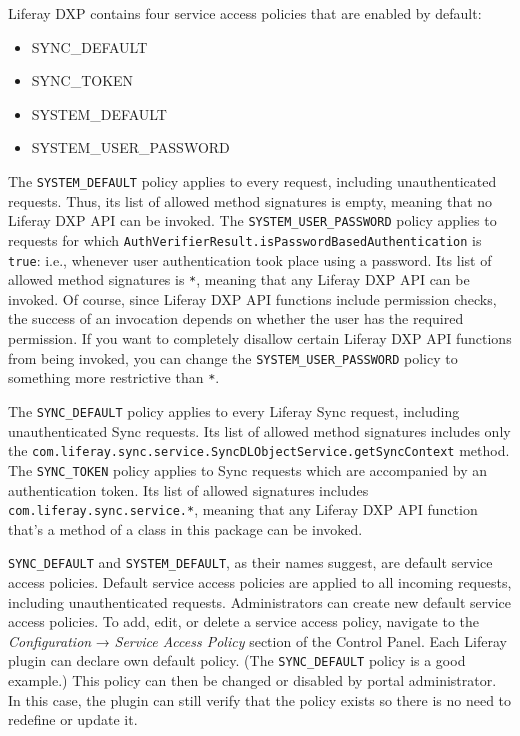 Liferay DXP contains four service access policies that are enabled by
default:

\begin{itemize}
\tightlist
\item
  SYNC\_DEFAULT
\item
  SYNC\_TOKEN
\item
  SYSTEM\_DEFAULT
\item
  SYSTEM\_USER\_PASSWORD
\end{itemize}

The \texttt{SYSTEM\_DEFAULT} policy applies to every request, including
unauthenticated requests. Thus, its list of allowed method signatures is
empty, meaning that no Liferay DXP API can be invoked. The
\texttt{SYSTEM\_USER\_PASSWORD} policy applies to requests for which
\texttt{AuthVerifierResult.isPasswordBasedAuthentication} is
\texttt{true}: i.e., whenever user authentication took place using a
password. Its list of allowed method signatures is \texttt{*}, meaning
that any Liferay DXP API can be invoked. Of course, since Liferay DXP
API functions include permission checks, the success of an invocation
depends on whether the user has the required permission. If you want to
completely disallow certain Liferay DXP API functions from being
invoked, you can change the \texttt{SYSTEM\_USER\_PASSWORD} policy to
something more restrictive than \texttt{*}.

The \texttt{SYNC\_DEFAULT} policy applies to every Liferay Sync request,
including unauthenticated Sync requests. Its list of allowed method
signatures includes only the
\texttt{com.liferay.sync.service.SyncDLObjectService.getSyncContext}
method. The \texttt{SYNC\_TOKEN} policy applies to Sync requests which
are accompanied by an authentication token. Its list of allowed
signatures includes \texttt{com.liferay.sync.service.*}, meaning that
any Liferay DXP API function that's a method of a class in this package
can be invoked.

\texttt{SYNC\_DEFAULT} and \texttt{SYSTEM\_DEFAULT}, as their names
suggest, are default service access policies. Default service access
policies are applied to all incoming requests, including unauthenticated
requests. Administrators can create new default service access policies.
To add, edit, or delete a service access policy, navigate to the
\emph{Configuration} → \emph{Service Access Policy} section of the
Control Panel. Each Liferay plugin can declare own default policy. (The
\texttt{SYNC\_DEFAULT} policy is a good example.) This policy can then
be changed or disabled by portal administrator. In this case, the plugin
can still verify that the policy exists so there is no need to redefine
or update it.

